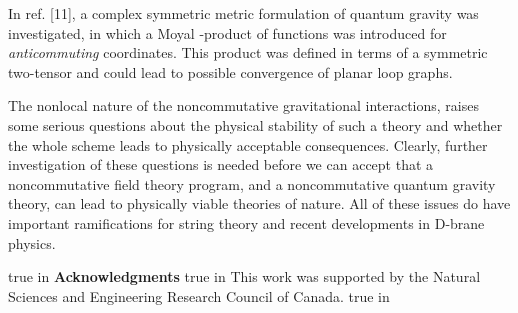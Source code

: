 \documentclass[a4paper,10pt]{article}
\begin{document}
In ref. [11], a complex symmetric metric formulation of quantum
gravity was investigated, in which a Moyal \myHighlight{$\diamond$}\coordHE{}-product of functions 
was introduced for {\it anticommuting} coordinates. This product was 
defined in terms of a symmetric two-tensor \myHighlight{$\tau^{\mu\nu}=\tau^{\nu\mu}$}\coordHE{} 
and could lead to possible convergence of planar loop graphs.

The nonlocal nature of the noncommutative
gravitational interactions, raises some serious questions about the
physical stability of such a theory and whether the whole scheme leads to
physically acceptable consequences. Clearly, further investigation of these
questions is needed before we can accept that a noncommutative field
theory program, and a noncommutative quantum gravity theory, can lead to
physically viable theories of nature. All of these issues do have
important ramifications for string theory and recent developments in
D-brane physics.

true in {\bf Acknowledgments}
 true in
This work was supported by the Natural Sciences and Engineering Research Council of
Canada.
 true in
\end{document}
